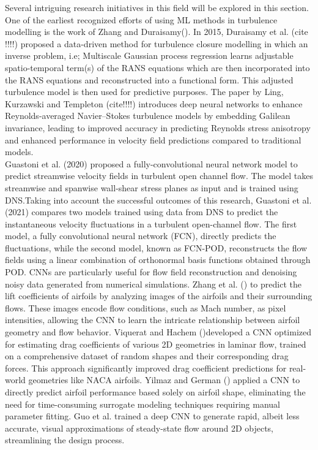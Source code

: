 Several intriguing research initiatives in this field will be explored in this section. One of the earliest recognized efforts of using ML methods in turbulence modelling is the work of Zhang and Duraisamy(). In 2015, Duraisamy et al. (cite !!!!) proposed a data-driven method for turbulence closure modelling in which an inverse problem, i.e; Multiscale Gaussian process regression learns adjustable spatio-temporal term(s) of the RANS equations which are then incorporated into the RANS equations and reconstructed into a functional form. This adjusted turbulence model is then used for predictive purposes. The paper by Ling, Kurzawski and Templeton (cite!!!!) introduces deep neural networks to enhance Reynolds-averaged Navier–Stokes turbulence models by embedding Galilean invariance, leading to improved accuracy in predicting Reynolds stress anisotropy and enhanced performance in velocity field predictions compared to traditional models. \\
Guastoni et al. (2020) proposed a fully-convolutional neural network model to predict streamwise velocity fields in turbulent open channel flow. The model takes streamwise and spanwise wall-shear stress planes as input and is trained using DNS.Taking into account the successful outcomes of this research, Guastoni et al. (2021) compares two models trained using data from DNS to predict the instantaneous velocity fluctuations in a turbulent open-channel flow. The first model, a fully convolutional neural network (FCN), directly predicts the fluctuations, while the second model, known as FCN-POD, reconstructs the flow fields using a linear combination of orthonormal basis functions obtained through POD. CNNs are particularly useful for flow field reconstruction and denoising noisy data generated from numerical simulations. Zhang et al. () to predict the lift coefficients of airfoils by analyzing images of the airfoils and their surrounding flows. These images encode flow conditions, such as Mach number, as pixel intensities, allowing the CNN to learn the intricate relationship between airfoil geometry and flow behavior. Viquerat and Hachem ()developed a CNN optimized for estimating drag coefficients of various 2D geometries in laminar flow, trained on a comprehensive dataset of random shapes and their corresponding drag forces. This approach significantly improved drag coefficient predictions for real-world geometries like NACA airfoils. Yilmaz and German () applied a CNN to directly predict airfoil performance based solely on airfoil shape, eliminating the need for time-consuming surrogate modeling techniques requiring manual parameter fitting. Guo et al. trained a deep CNN to generate rapid, albeit less accurate, visual approximations of steady-state flow around 2D objects, streamlining the design process.\\

